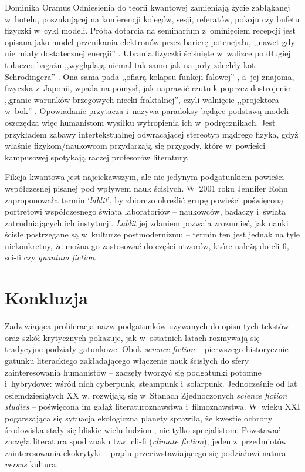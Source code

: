\begin{artplenv}{Dominika Oramus}
Odniesienia do teorii kwantowej zamieniają życie zabłąkanej w~hotelu, poszukującej na konferencji kolegów, sesji, referatów, pokoju czy bufetu fizyczki w~cykl modeli. Próba dotarcia na seminarium z~ominięciem recepcji jest opisana jako model przenikania elektronów przez barierę potencjału, ,,nawet gdy nie miały dostatecznej energii''
\parencite[][s.~11]{willis_niebieski_2010}. %
 Ubrania fizyczki ściśnięte w~walizce po długiej tułaczce bagażu ,,wyglądają niemal tak samo jak na poły zdechły kot Schrödingera'' 
\parencite[][s.~12]{willis_niebieski_2010}. %
 Ona sama pada ,,ofiarą kolapsu funkcji falowej'' 
\parencite[][s.~15]{willis_niebieski_2010}, %
 a~jej znajoma, fizyczka z~Japonii, wpada na pomysł, jak naprawić rzutnik poprzez dostrojenie ,,granic warunków brzegowych niecki fraktalnej'', czyli walnięcie ,,projektora w~bok'' 
\parencite[][s.~21]{willis_niebieski_2010}. %
 Opowiadanie przytacza i~nazywa paradoksy będące podstawą modeli -- oszczędza więc humanistom wysiłku wytropienia ich w~podręcznikach. Jest przykładem zabawy intertekstualnej odwracającej stereotyp mądrego fizyka, gdyż właśnie fizykom/naukowcom przydarzają się przygody, które w~powieści kampusowej spotykają raczej profesorów literatury.

Fikcja kwantowa jest najciekawszym, ale nie jedynym podgatunkiem powieści współczesnej pisanej pod wpływem nauk ścisłych. W~2001 roku Jennifer Rohn zaproponowała termin ‘\textit{lablit}’, by zbiorczo określić grupę powieści poświęconą portretowi współczesnego świata laboratoriów -- naukowców, badaczy i~świata zatrudniających ich instytucji. \textit{Lablit} jej zdaniem pozwala zrozumieć, jak nauki ścisłe postrzegane są w~kulturze postmodernizmu -- termin ten jest jednak na tyle niekonkretny, że można go zastosować do części utworów, które należą do cli-fi, sci-fi czy \textit{quantum fiction}.

\section*{Konkluzja}
Zadziwiająca proliferacja nazw podgatunków używanych do opisu tych tekstów oraz szkół krytycznych pokazuje, jak w~ostatnich latach rozmywają się tradycyjne podziały gatunkowe. Obok \textit{science fiction} -- pierwszego historycznie gatunku literackiego zakładającego włączenie nauk ścisłych do sfery zainteresowania humanistów -- zaczęły tworzyć się podgatunki potomne i~hybrydowe: wśród nich cyberpunk, steampunk i~solarpunk. Jednocześnie od lat osiemdziesiątych XX w. rozwijają się w~Stanach Zjednoczonych \textit{science} \textit{fiction studies} -- poświęcona im gałąź literaturoznawstwa i~filmoznawstwa. W~wieku XXI pogarszająca się sytuacja ekologiczna planety sprawiła, że kwestie ochrony środowiska stały się bliskie wielu ludziom, nie tylko specjalistom. Powstawać zaczęła literatura spod znaku tzw. cli-fi (\textit{climate fiction}), jeden z~przedmiotów zainteresowania ekokrytyki -- prądu przeciwstawiającego się podziałowi natura \textit{versus} kultura.


\end{artplenv}
